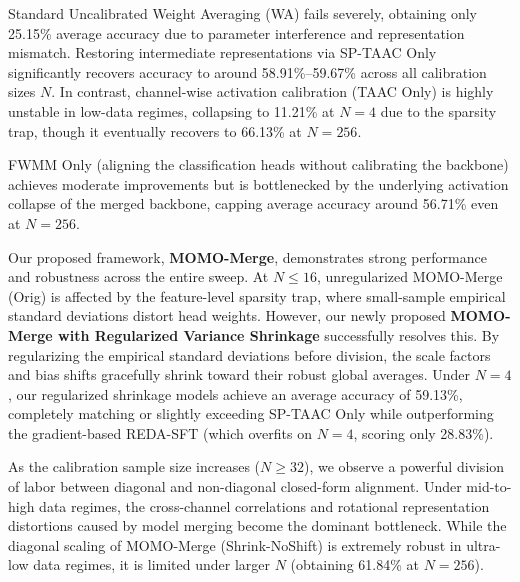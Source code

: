 \documentclass{article}
\theoremstyle{plain}
\theoremstyle{definition}
\theoremstyle{remark}
\begin{document}
Standard Uncalibrated Weight Averaging (WA) fails severely, obtaining only 25.15\% average accuracy due to parameter interference and representation mismatch. Restoring intermediate representations via SP-TAAC Only significantly recovers accuracy to around 58.91\%--59.67\% across all calibration sizes $N$. In contrast, channel-wise activation calibration (TAAC Only) is highly unstable in low-data regimes, collapsing to 11.21\% at $N=4$ due to the sparsity trap, though it eventually recovers to 66.13\% at $N=256$.

FWMM Only (aligning the classification heads without calibrating the backbone) achieves moderate improvements but is bottlenecked by the underlying activation collapse of the merged backbone, capping average accuracy around 56.71\% even at $N=256$.

Our proposed framework, \textbf{MOMO-Merge}, demonstrates strong performance and robustness across the entire sweep.
At $N \le 16$, unregularized MOMO-Merge (Orig) is affected by the feature-level sparsity trap, where small-sample empirical standard deviations distort head weights. 
However, our newly proposed \textbf{MOMO-Merge with Regularized Variance Shrinkage} successfully resolves this. By regularizing the empirical standard deviations before division, the scale factors and bias shifts gracefully shrink toward their robust global averages. Under $N=4$, our regularized shrinkage models achieve an average accuracy of 59.13\%, completely matching or slightly exceeding SP-TAAC Only while outperforming the gradient-based REDA-SFT (which overfits on $N=4$, scoring only 28.83\%).

As the calibration sample size increases ($N \ge 32$), we observe a powerful division of labor between diagonal and non-diagonal closed-form alignment. Under mid-to-high data regimes, the cross-channel correlations and rotational representation distortions caused by model merging become the dominant bottleneck. While the diagonal scaling of MOMO-Merge (Shrink-NoShift) is extremely robust in ultra-low data regimes, it is limited under larger $N$ (obtaining 61.84\% at $N=256$).
\end{document}
